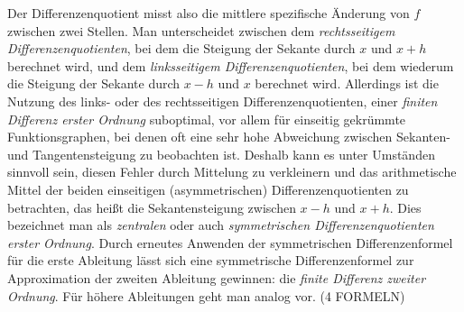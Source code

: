 \documentclass{scrartcl}
\begin{document}
Der Differenzenquotient misst also die mittlere spezifische Änderung von $f$ zwischen zwei Stellen. Man unterscheidet zwischen dem \textit{rechtsseitigem Differenzenquotienten}, bei dem die Steigung der Sekante durch $x$ und $x+h$ berechnet wird, und dem \textit{linksseitigem Differenzenquotienten}, bei dem wiederum die Steigung der Sekante durch $x-h$ und $x$ berechnet wird. Allerdings ist die Nutzung des links- oder des rechtsseitigen Differenzenquotienten, einer \textit{finiten Differenz erster Ordnung} suboptimal, vor allem für einseitig gekrümmte Funktionsgraphen, bei denen oft eine sehr hohe Abweichung zwischen Sekanten- und Tangentensteigung zu beobachten ist. Deshalb kann es unter Umständen sinnvoll sein, diesen Fehler durch Mittelung zu verkleinern und das arithmetische Mittel der beiden einseitigen (asymmetrischen) Differenzenquotienten zu betrachten, das heißt die Sekantensteigung zwischen $x-h$ und $x+h$. Dies bezeichnet man als \textit{zentralen} oder auch \textit{symmetrischen Differenzenquotienten erster Ordnung}. Durch erneutes Anwenden der symmetrischen Differenzenformel für die erste Ableitung lässt sich eine symmetrische Differenzenformel zur Approximation der zweiten Ableitung gewinnen: die \textit{finite Differenz zweiter Ordnung}. Für höhere Ableitungen geht man analog vor. (4 FORMELN) \\
\end{document}

